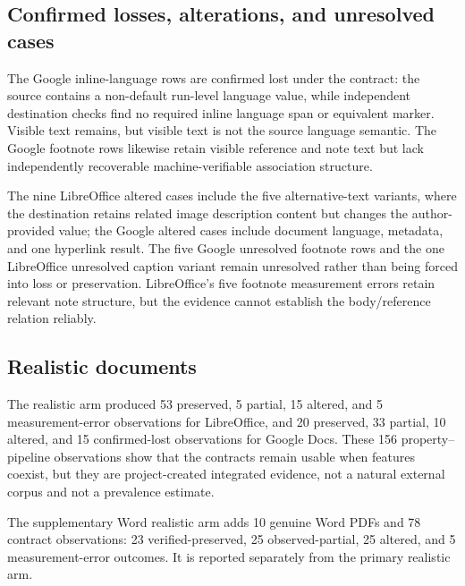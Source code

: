 \subsection{Confirmed losses, alterations, and unresolved cases}
The Google inline-language rows are confirmed lost under the contract: the source contains a non-default run-level language value, while independent destination checks find no required inline language span or equivalent marker. Visible text remains, but visible text is not the source language semantic. The Google footnote rows likewise retain visible reference and note text but lack independently recoverable machine-verifiable association structure.

The nine LibreOffice altered cases include the five alternative-text variants, where the destination retains related image description content but changes the author-provided value; the Google altered cases include document language, metadata, and one hyperlink result. The five Google unresolved footnote rows and the one LibreOffice unresolved caption variant remain unresolved rather than being forced into loss or preservation. LibreOffice's five footnote measurement errors retain relevant note structure, but the evidence cannot establish the body/reference relation reliably.

\subsection{Realistic documents}
The realistic arm produced 53 preserved, 5 partial, 15 altered, and 5 measurement-error observations for LibreOffice, and 20 preserved, 33 partial, 10 altered, and 15 confirmed-lost observations for Google Docs. These 156 property--pipeline observations show that the contracts remain usable when features coexist, but they are project-created integrated evidence, not a natural external corpus and not a prevalence estimate.

The supplementary Word realistic arm adds 10 genuine Word PDFs and 78 contract observations: 23 verified-preserved, 25 observed-partial, 25 altered, and 5 measurement-error outcomes. It is reported separately from the primary realistic arm.
